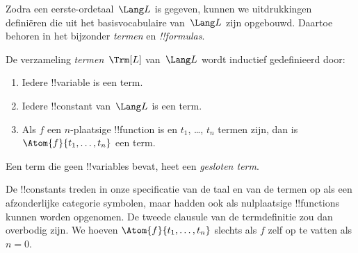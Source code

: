 \documentclass[openany]{memoir}
\begin{document}


Zodra een eerste-ordetaal~$\Lang L$ is gegeven, kunnen we uitdrukkingen
definiëren die uit het basisvocabulaire van~$\Lang L$ zijn opgebouwd.
Daartoe behoren in het bijzonder \emph{termen} en \emph{!!{formula}s}.

\begin{defn}[Termen]
De verzameling \emph{termen}~$\Trm[L]$ van~$\Lang L$ wordt inductief
gedefinieerd door:
\begin{enumerate}
\item Iedere !!{variable} is een term.
\item Iedere !!{constant} van~$\Lang L$ is een term.
\item Als $f$ een $n$-plaatsige !!{function} is en $t_1$, \dots, $t_n$
  termen zijn, dan is $\Atom{f}{t_1, \ldots, t_n}$ een term.
\end{enumerate}
Een term die geen !!{variable}s bevat, heet een \emph{gesloten term}.
\end{defn}

\begin{explain}
De !!{constant}s treden in onze specificatie van de taal en van de
termen op als een afzonderlijke categorie symbolen, maar hadden ook als
nulplaatsige !!{function}s kunnen worden opgenomen. De tweede clausule
van de termdefinitie zou dan overbodig zijn. We hoeven
$\Atom{f}{t_1, \ldots, t_n}$ slechts als $f$ zelf op te vatten als $n =
0$.
\end{explain}
\end{document}
